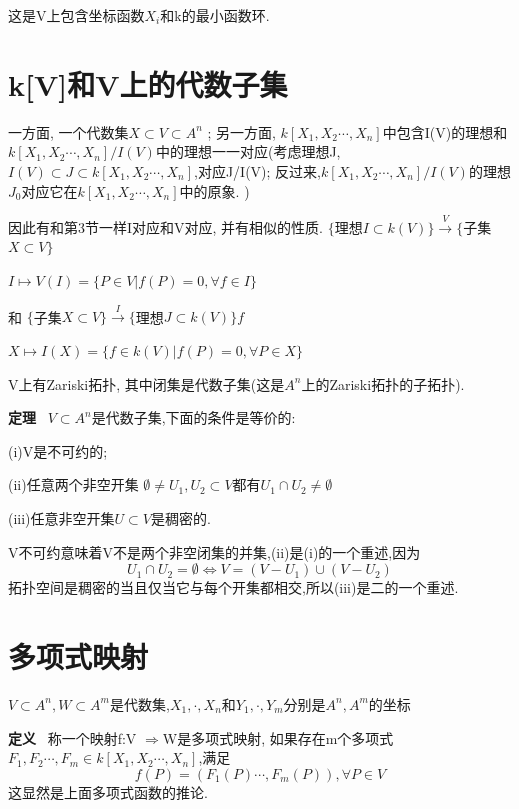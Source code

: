 \documentclass[UTF8]{book}
\begin{document}
		\justifying
		这是V上包含坐标函数$X_{i}$和k的最小函数环.


	\section{k[V]和V上的代数子集} 一方面, 一个代数集$X\subset V\subset A^{n}$ ; 另一方面, $k[X_{1},X_{2}\cdots,X_{n}]$中包含I(V)的理想和$ k[X_{1},X_{2}\cdots,X_{n}]/I(V)$中的理想一一对应(考虑理想J,$I(V) \subset J \subset k[X_{1},X_{2}\cdots,X_{n}]$,对应J/I(V); 反过来,$k[X_{1},X_{2}\cdots,X_{n}]/I(V)$的理想$J_{0}$对应它在$k[X_{1},X_{2}\cdots,X_{n}]$中的原象. )

		因此有和第3节一样I对应和V对应, 并有相似的性质.
			   \center  $\{$理想$I\subset k(V)\}\stackrel{V}{\longrightarrow} \{$子集$X\subset V \}$



			  $ I \longmapsto V(I)=\{P\in V\vert f(P)=0,\forall f \in I \}$

		\justifying
		和
			\center  $\{$子集$X\subset V \}\stackrel{I}{\longrightarrow} \{$理想$J\subset k(V)\}f$


			   $ X \longmapsto I(X)=\{f\in k(V)\vert f(P)=0,\forall P \in X\}$

		\justifying
		V上有Zariski拓扑, 其中闭集是代数子集(这是$A^{n}$上的Zariski拓扑的子拓扑).

		\textbf{定理} \ $V\subset A^{n}$是代数子集,下面的条件是等价的:

		(i)V是不可约的;

		(ii)任意两个非空开集 $\emptyset \neq U_{1},U_{2} \subset V $都有$U_{1} \cap U_{2}\neq \emptyset$

		(iii)任意非空开集$U\subset V$是稠密的.

		V不可约意味着V不是两个非空闭集的并集,(ii)是(i)的一个重述,因为
		\begin{equation*}
		U_{1}\cap U_{2}=\emptyset \Longleftrightarrow V=(V-U_{1})\cup (V-U_{2})
		\end{equation*}
		拓扑空间是稠密的当且仅当它与每个开集都相交,所以(iii)是二的一个重述.

	\section{多项式映射} $V\subset A^{n},W\subset A^{m}$是代数集,$X_{1},\cdot,X_{n}$和$Y_{1},\cdot,Y_{m}$分别是$A^{n},A^{m}$的坐标

		\textbf{定义} \ 称一个映射f:V $\Rightarrow $W是多项式映射, 如果存在m个多项式$F_{1},F_{2}\cdots,F_{m}\in k[X_{1},X_{2}\cdots,X_{n}]$,满足
		\begin{equation*}
		f(P)=(F_{1}(P)\cdots,F_{m}(P)), \forall  P\in V
		\end{equation*}
		这显然是上面多项式函数的推论.
\end{document}
